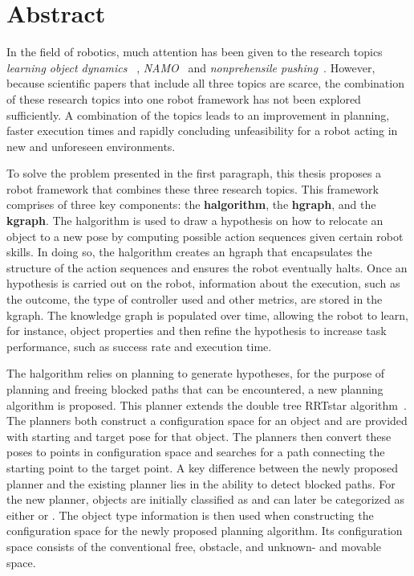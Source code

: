 \chapter*{Abstract}
In the field of robotics, much attention has been given to the research topics \textit{learning object dynamics}~\cite{cong_selfadapting_2020,seegmiller_vehicle_2013}
, \textit{\acf{NAMO}}~\cite{chen_fast_2018,elbanhawi_samplingbased_2014,kingston_samplingbased_2018,lavalle_planning_2006} and \textit{nonprehensile pushing}~\cite{arruda_uncertainty_2017,bauza_dataefficient_2018,mericli_pushmanipulation_2015,stuber_featurebased_2018,stuber_let_2020,toussaint_sequenceofconstraints_2022}. However, because scientific papers that include all three topics are scarce, the combination of these research topics into one robot framework has not been explored sufficiently. A combination of the topics leads to an improvement in planning, faster execution times and rapidly concluding unfeasibility for a robot acting in new and unforeseen environments.\bs

To solve the problem presented in the first paragraph, this thesis proposes a robot framework that combines these three research topics. This framework comprises of three key components: the \textbf{\acl{halgorithm}}, the \textbf{\acl{hgraph}}, and the \textbf{\acl{kgraph}}. The \acl{halgorithm} is used to draw a hypothesis on how to relocate an object to a new pose by computing possible action sequences given certain robot skills. In doing so, the \acl{halgorithm} creates an \acl{hgraph} that encapsulates the structure of the action sequences and ensures the robot eventually halts. Once an hypothesis is carried out on the robot, information about the execution, such as the outcome, the type of controller used and other metrics, are stored in the \acl{kgraph}. The knowledge graph is populated over time, allowing the robot to learn, for instance, object properties and then refine the hypothesis to increase task performance, such as success rate and execution time.\bs

The \acl{halgorithm} relies on planning to generate hypotheses, for the purpose of planning and freeing blocked paths that can be encountered, a new planning algorithm is proposed. This planner extends the double tree \acl{RRTstar} algorithm~\cite{chen_fast_2018}. The planners both construct a configuration space for an object and are provided with starting and target pose for that object. The planners then convert these poses to points in configuration space and searches for a path connecting the starting point to the target point. A key difference between the newly proposed planner and the existing planner lies in the ability to detect blocked paths. For the new planner, objects are initially classified as  and can later be categorized as either  or . The object type information is then used when constructing the configuration space for the newly proposed planning algorithm. Its configuration space consists of the conventional free, obstacle, and unknown- and movable space.\bs


